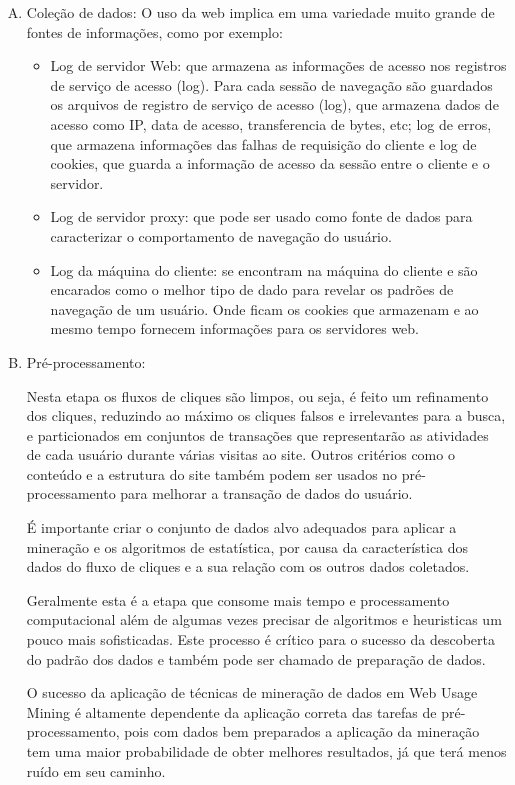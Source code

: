 \begin{enumerate}[A)]
\item Coleção de dados:
    O uso da web implica em uma variedade muito grande de fontes de informações, como por exemplo:
\begin{itemize}
\item 	Log de servidor Web: que armazena as informações de acesso nos registros de serviço de acesso (log). Para cada sessão de navegação são guardados os arquivos de registro de serviço de acesso (log), que armazena dados de acesso como IP, data de acesso, transferencia de bytes, etc; log de erros, que armazena informações das falhas de requisição do cliente e log de cookies, que guarda a informação de acesso da sessão entre o cliente e o servidor.
\item Log de servidor proxy: que pode ser usado como fonte de dados para caracterizar o comportamento de navegação do usuário.
\item Log da máquina do cliente: se encontram na máquina do cliente e são encarados como o melhor tipo de dado para revelar os padrões de navegação de um usuário. Onde ficam os cookies que armazenam e ao mesmo tempo fornecem informações para os servidores web.
\end{itemize}

\item Pré-processamento:

	 Nesta etapa os fluxos de cliques são limpos, ou seja, é feito um refinamento dos cliques, reduzindo ao máximo os cliques falsos e irrelevantes para a busca, e particionados em conjuntos de transações que representarão as atividades de cada usuário durante várias visitas ao site. Outros critérios como o conteúdo e a estrutura do site também podem ser usados no pré-processamento para melhorar a transação de dados do usuário.

	É importante criar o conjunto de dados alvo adequados para aplicar a mineração e os algoritmos de estatística, por causa da característica dos dados do fluxo de cliques e a sua relação com os outros dados coletados.

	Geralmente esta é a etapa que consome mais tempo e processamento computacional além de  algumas vezes precisar de algoritmos e heuristicas um pouco mais sofisticadas. Este processo é crítico para o sucesso da descoberta do padrão dos dados e também pode ser chamado de preparação de dados.

	O sucesso da aplicação de técnicas de mineração de dados em Web Usage Mining é altamente dependente da aplicação correta das tarefas de pré-processamento, pois com dados bem preparados a aplicação da mineração tem uma maior probabilidade de obter melhores resultados, já que terá menos ruído em seu caminho.


\end{enumerate}
